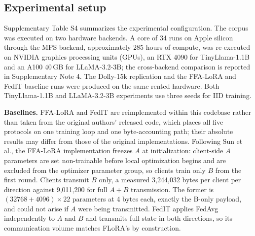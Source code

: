 \documentclass[pdflatex,sn-nature,lineno]{sn-jnl}
\begin{document}
\subsection{Experimental setup}
\label{sec:setup}
Supplementary Table S4 summarizes the experimental configuration. The corpus was executed on two hardware backends. A core of 34 runs on Apple silicon through the MPS backend, approximately 285 hours of compute, was re-executed on NVIDIA graphics processing units (GPUs), an RTX 4090 for TinyLlama-1.1B and an A100 40\,GB for LLaMA-3.2-3B; the cross-backend comparison is reported in Supplementary Note 4. The Dolly-15k replication and the FFA-LoRA and FedIT baseline runs were produced on the same rented hardware. Both TinyLlama-1.1B and LLaMA-3.2-3B experiments use three seeds for IID training.

\textbf{Baselines.} FFA-LoRA \cite{sun2024ffalora} and FedIT \cite{zhang2024federatedgpt} are reimplemented within this codebase rather than taken from the original authors' released code, which places all five protocols on one training loop and one byte-accounting path; their absolute results may differ from those of the original implementations. Following Sun et al., the FFA-LoRA implementation freezes $A$ at initialization: client-side $A$ parameters are set non-trainable before local optimization begins and are excluded from the optimizer parameter group, so clients train only $B$ from the first round. Clients transmit $B$ only, a measured 3{,}244{,}032 bytes per client per direction against 9{,}011{,}200 for full $A{+}B$ transmission. The former is $(32768 + 4096) \times 22$ parameters at 4 bytes each, exactly the B-only payload, and could not arise if $A$ were being transmitted. FedIT applies FedAvg independently to $A$ and $B$ and transmits full state in both directions, so its communication volume matches FLoRA's by construction.
\end{document}

